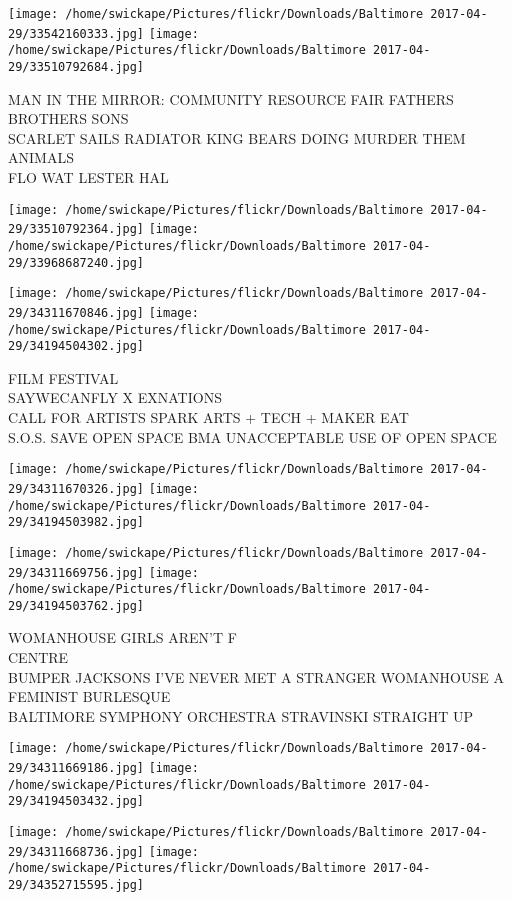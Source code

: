 \documentclass[10pt,letterpaper]{article}
\begin{document}
\vspace{0.25in}
\texttt{[image: /home/swickape/Pictures/flickr/Downloads/Baltimore 2017-04-29/33542160333.jpg]}
\texttt{[image: /home/swickape/Pictures/flickr/Downloads/Baltimore 2017-04-29/33510792684.jpg]}

MAN IN THE MIRROR: COMMUNITY RESOURCE FAIR FATHERS BROTHERS SONS\\
SCARLET SAILS RADIATOR KING BEARS DOING MURDER THEM ANIMALS\\
FLO WAT LESTER HAL
\pagebreak

\texttt{[image: /home/swickape/Pictures/flickr/Downloads/Baltimore 2017-04-29/33510792364.jpg]}
\texttt{[image: /home/swickape/Pictures/flickr/Downloads/Baltimore 2017-04-29/33968687240.jpg]}

\texttt{[image: /home/swickape/Pictures/flickr/Downloads/Baltimore 2017-04-29/34311670846.jpg]}
\texttt{[image: /home/swickape/Pictures/flickr/Downloads/Baltimore 2017-04-29/34194504302.jpg]}

FILM FESTIVAL\\
SAYWECANFLY X EXNATIONS\\
CALL FOR ARTISTS SPARK ARTS + TECH + MAKER EAT\\
S.O.S. SAVE OPEN SPACE BMA UNACCEPTABLE USE OF OPEN SPACE
\pagebreak

\texttt{[image: /home/swickape/Pictures/flickr/Downloads/Baltimore 2017-04-29/34311670326.jpg]}
\texttt{[image: /home/swickape/Pictures/flickr/Downloads/Baltimore 2017-04-29/34194503982.jpg]}

\texttt{[image: /home/swickape/Pictures/flickr/Downloads/Baltimore 2017-04-29/34311669756.jpg]}
\texttt{[image: /home/swickape/Pictures/flickr/Downloads/Baltimore 2017-04-29/34194503762.jpg]}

WOMANHOUSE GIRLS AREN'T F\\
CENTRE\\
BUMPER JACKSONS I'VE NEVER MET A STRANGER WOMANHOUSE A FEMINIST BURLESQUE\\
BALTIMORE SYMPHONY ORCHESTRA STRAVINSKI STRAIGHT UP
\pagebreak

\texttt{[image: /home/swickape/Pictures/flickr/Downloads/Baltimore 2017-04-29/34311669186.jpg]}
\texttt{[image: /home/swickape/Pictures/flickr/Downloads/Baltimore 2017-04-29/34194503432.jpg]}

\texttt{[image: /home/swickape/Pictures/flickr/Downloads/Baltimore 2017-04-29/34311668736.jpg]}
\texttt{[image: /home/swickape/Pictures/flickr/Downloads/Baltimore 2017-04-29/34352715595.jpg]}
\end{document}
